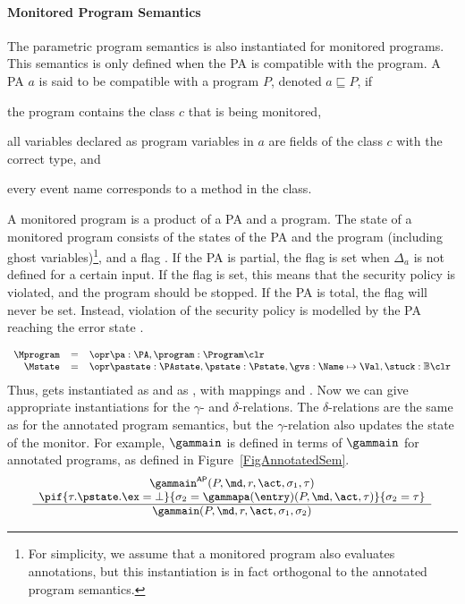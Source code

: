 \paragraph{Monitored Program Semantics}
The parametric program semantics is also instantiated for monitored
programs. This semantics is only defined when the PA is compatible
with the program. A PA \(a\) is said to be compatible with a program
\(P\), denoted \(a \sqsubseteq P\), if
\begin{inparaenum}
\item the program contains the class \(c\) that is being monitored,
\item all variables declared as program variables in
\(a\) are fields of the class \(c\) with the correct type, and
\item every event name corresponds to a method in the class.
\end{inparaenum}
A monitored program is a product of a PA and a program. The state of a
monitored program consists of the states of the PA and the program
(including ghost variables)\footnote{For simplicity, we assume that a
monitored program also evaluates annotations, but this instantiation
is in fact orthogonal to the annotated program semantics.}, and a flag
\stuck. If the PA is partial, the flag
\stuck is set when \(\Delta_a\) is not defined for a
certain input. If the flag is set, this means that the security policy
is violated, and the program should be stopped. If the PA is total,
the \stuck flag will never be set. Instead, violation of the security
policy is modelled by the PA reaching the error state \halted.

\[
{\small
\begin{array}{rcl}
\Mprogram & =  & \opr \pa : \PA, \program : \Program \clr\\
\Mstate & = & \opr \pastate : \PAstate, \pstate : \Pstate, \gvs :  \Name \mapsto \Val, \stuck
: \mathbb{B} \clr
\end{array}}
\]
Thus, \FullProgram gets instantiated as \Mprogram and \FullState as
\Mstate, with mappings \program and \pstate. Now we can give
appropriate instantiations for the \(\gamma\)- and
\(\delta\)-relations. The \(\delta\)-relations are the same as
for the annotated program semantics, but the \(\gamma\)-relation also
updates the state of the monitor. For example, \(\gammain\) is defined
in terms of \(\gammain\) for annotated programs, as defined in
Figure~\ref{FigAnnotatedSem}.
\[
{\small
\begin{array}{c}
\gammain^{\mathsf{AP}}(P, \md, r, \act, \sigma_1, \tau) \\
\pif{\tau.\pstate.\ex = \bot}
    {\sigma_2 = \gammapa(\entry)(P, \md, \act, \tau)}
    {\sigma_2 = \tau}\\
\hline
\gammain(P, \md, r, \act, \sigma_1, \sigma_2)
\end{array}}
\]


